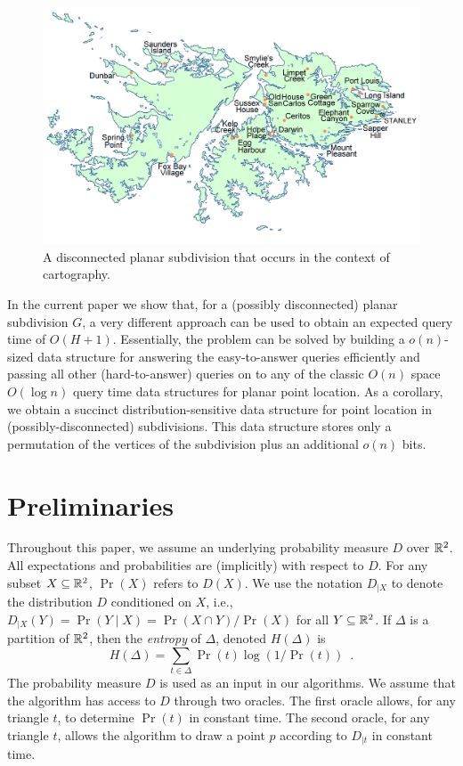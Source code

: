 \documentclass{patmorin}
\begin{document}
\begin{figure}
  \begin{center}\includegraphics[width=5in]{falklands}\end{center}
  \caption{A disconnected planar subdivision that occurs in the context of
cartography.}
\end{figure}

In the current paper we show that, for a (possibly disconnected)
planar subdivision $G$, a very different approach can be used to obtain
an expected query time of $O(H+1)$. Essentially, the problem can be
solved by building a $o(n)$-sized data structure for answering the
easy-to-answer queries efficiently and passing all other (hard-to-answer)
queries on to any of the classic $O(n)$ space $O(\log n)$ query time
data structures for planar point location. As a corollary, we obtain
a succinct distribution-sensitive data structure for point location in
(possibly-disconnected) subdivisions.  This data structure stores only
a permutation of the vertices of the subdivision plus an additional
$o(n)$ bits.

\section{Preliminaries}

Throughout this paper, we assume an underlying probability measure
$D$ over $\mathbb{R}^2$.  All expectations and probabilities are (implicitly)
with respect to $D$.  For any subset $X\subseteq\mathbb{R}^2$, $\Pr(X)$ refers
to $D(X)$.  We use the notation $D_{|X}$ to denote the distribution $D$
conditioned on $X$, i.e., $D_{|X}(Y)=\Pr(Y\mid X)=\Pr(X\cap Y)/\Pr(X)$
for all $Y\subseteq\mathbb{R}^2$.  If $\Delta$ is a partition of $\mathbb{R}^2$, then
the \emph{entropy} of $\Delta$, denoted $H(\Delta)$ is
\[
    H(\Delta) = \sum_{t\in \Delta} \Pr(t)\log(1/\Pr(t)) \enspace .
\]
The probability measure $D$ is used as an input in our algorithms.
We assume that the algorithm has access to $D$ through two oracles.
The first oracle allows, for any triangle $t$, to determine $\Pr(t)$
in constant time.  The second oracle, for any triangle $t$, allows the
algorithm to draw a point $p$ according to $D_{|t}$ in constant time.
\end{document}
